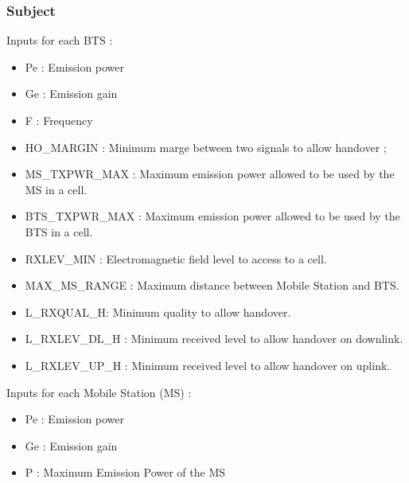 \documentclass{beamer}
\begin{document}
\begin{frame}
\frametitle{Subject}
Inputs for each BTS :
\begin{itemize}
  \item Pe : Emission power
  \item Ge : Emission gain
  \item F : Frequency
  \item HO\_MARGIN : Minimum marge between two signals to allow handover ;
  \item MS\_TXPWR\_MAX : Maximum emission power allowed to be used by the MS in a cell.
\end{itemize}

\end{frame}
\begin{frame}
\begin{itemize}
  \item BTS\_TXPWR\_MAX : Maximum emission power allowed to be used by the BTS in a cell.
  \item RXLEV\_MIN : Electromagnetic field level to access to a cell.
  \item MAX\_MS\_RANGE : Maximum distance between Mobile Station and BTS.
  \item L\_RXQUAL\_H: Minimum quality to allow handover.
  \item L\_RXLEV\_DL\_H : Minimum received level to allow handover on downlink.
  \item L\_RXLEV\_UP\_H : Minimum received level to allow handover on uplink.
\end{itemize}
\end{frame}
\begin{frame}
Inputs for each Mobile Station (MS) :
\begin{itemize}
  \item Pe : Emission power
  \item Ge : Emission gain
  \item P : Maximum Emission Power of the MS
\end{itemize}

\end{frame}
\end{document}
